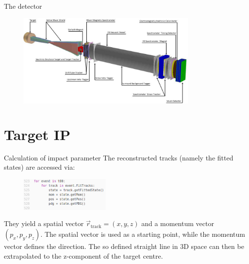 \begin{frame}[t]{The detector}
  \begin{figure}
    \centering
    \includegraphics[width=0.8\textwidth]{tpdetector.jpg}
  \end{figure}
\end{frame}

\section{Target IP}




\begin{frame}[t]{Calculation of impact parameter}
    The reconstructed tracks (namely the fitted states) are accessed via:
    \begin{figure}
      \includegraphics[width=0.4\textwidth,left]{loop.png}
    \end{figure}
    They yield a spatial vector $\vec{r}_\text{track}=(x,y,z)$ and a momentum vector $(p_x,p_y,p_z)$. The spatial vector is used as a starting point, while the momentum vector defines the direction. The so defined straight line in 3D space can then be extrapolated to the z-component of the target centre.
\end{frame}

